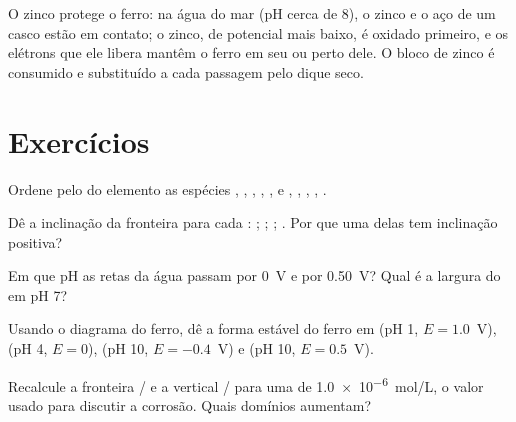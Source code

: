 O zinco protege o ferro: na água do mar (pH cerca de 8), o zinco e o aço
de um casco estão em contato; o zinco, de potencial mais baixo, é
oxidado primeiro, e os elétrons que ele libera mantêm o ferro em seu
 ou perto dele. O bloco de zinco é consumido e
substituído a cada passagem pelo dique seco.

\section{Exercícios}

\begin{exercise}[$\star$]\label{exo:b1:e-ph-diagrams:1}
Ordene pelo  do elemento as espécies ,
, , , , e , ,
, , .
\end{exercise}

\begin{exercise}[$\star$]\label{exo:b1:e-ph-diagrams:2}
Dê a inclinação da fronteira para cada :
; ;
; .
Por que uma delas tem inclinação positiva?
\end{exercise}

\begin{exercise}[$\star$]\label{exo:b1:e-ph-diagrams:3}
Em que pH as retas da água passam por 0~V e por \qty{0.50}{V}? Qual é a
largura do  em pH 7?
\end{exercise}

\begin{exercise}[$\star$]\label{exo:b1:e-ph-diagrams:4}
Usando o diagrama do ferro, dê a forma estável do ferro em
(pH 1, $E = 1.0$~V), (pH 4, $E = 0$), (pH 10, $E = -0.4$~V) e
(pH 10, $E = 0.5$~V).
\end{exercise}

\begin{exercise}[$\star\star$]\label{exo:b1:e-ph-diagrams:5}
Recalcule a fronteira / e a vertical
/ para uma  de
\qty{1.0e-6}{mol/L}, o valor usado para discutir a corrosão. Quais
domínios aumentam?
\end{exercise}

